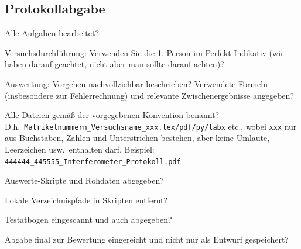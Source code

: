 \documentclass[twoside]{protokoll}
\begin{document}
\subsection*{Protokollabgabe}
\begin{checklist}
\item Alle Aufgaben bearbeitet?
\item Versuchsdurchführung: Verwenden Sie die 1. Person im Perfekt
  Indikativ (\glqq{}wir haben darauf geachtet\grqq{}, nicht aber
  \glqq{}man sollte darauf achten\grqq{})?
\item Auswertung: Vorgehen nachvollziehbar beschrieben? Verwendete
  Formeln (insbesondere zur Fehlerrechnung) und relevante
  Zwischenergebnisse angegeben?
\item Alle Dateien gemäß der vorgegebenen Konvention benannt?\newline
  D.h.~\texttt{Matrikelnummern\_Versuchsname\_xxx.tex/pdf/py/labx}
  etc., wobei \texttt{xxx} nur aus Buchstaben, Zahlen und
  Unterstrichen bestehen, aber keine Umlaute, Leerzeichen
  usw.~enthalten darf.\newline
  Beispiel:
  \texttt{444444\_445555\_Interferometer\_Protokoll.pdf}.
\item Auswerte-Skripte und Rohdaten abgegeben?
\item Lokale Verzeichnispfade in Skripten entfernt?
\item Testatbogen eingescannt und auch abgegeben?
\item Abgabe final zur Bewertung eingereicht und nicht nur als Entwurf
  gespeichert?
\end{checklist}

% 
%
\end{document}
